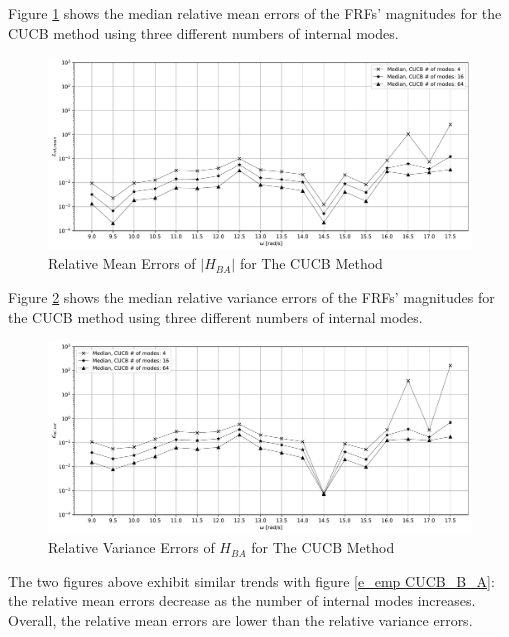 Figure \ref{e_mean CUCB_B_A} shows the median relative mean errors of the FRFs' magnitudes for the CUCB method using three different numbers of internal modes.
\begin{figure}[H]
    \centering
    \includegraphics[width=1.0\textwidth]{
        plots/substructuring/plot_11.pdf
    }
    \caption{%
        Relative Mean Errors of $\left|H_{BA}\right|$ for The CUCB Method
    }
    \label{e_mean CUCB_B_A}
\end{figure}
Figure \ref{e_var CUCB_B_A} shows the median relative variance errors of the FRFs' magnitudes for the CUCB method using three different numbers of internal modes.
\begin{figure}[H]
    \centering
    \includegraphics[width=1.0\textwidth]{
        plots/substructuring/plot_12.pdf
    }
    \caption{%
        Relative Variance Errors of $H_{BA}$ for The CUCB Method
    }
    \label{e_var CUCB_B_A}
\end{figure}
The two figures above exhibit similar trends with figure \ref{e_emp CUCB_B_A}: the relative mean errors decrease as the number of internal modes increases.
Overall, the relative mean errors are lower than the relative variance errors.

